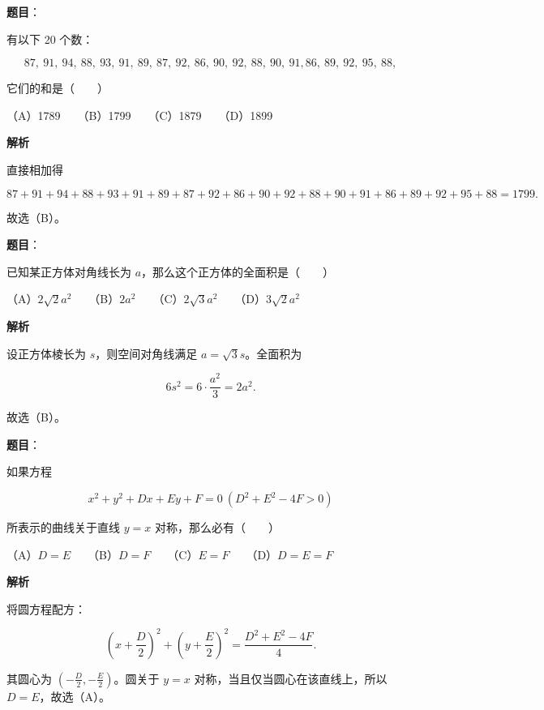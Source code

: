\begin{answer}

\textbf{题目}：

有以下 20 个数：

\nopagebreak[4]
\[
87,\ 91,\ 94,\ 88,\ 93,\ 91,\ 89,\ 87,\ 92,\ 86,\ 90,\ 92,\ 88,\ 90,\ 91,
86,\ 89,\ 92,\ 95,\ 88,
\]

它们的和是\mbox{（　　）}

（A）1789　　（B）1799　　（C）1879　　（D）1899

\textbf{解析}

直接相加得

\nopagebreak[4]
\[
87+91+94+88+93+91+89+87+92+86
+90+92+88+90+91+86+89+92+95+88=1799.
\]

故选（B）。


\end{answer}
\begin{answer}

\textbf{题目}：

已知某正方体对角线长为 $a$，那么这个正方体的全面积是\mbox{（　　）}

（A）$2\sqrt2a^2$　　（B）$2a^2$　　（C）$2\sqrt3a^2$　　（D）$3\sqrt2a^2$

\textbf{解析}

设正方体棱长为 $s$，则空间对角线满足 $a=\sqrt3s$。全面积为

\nopagebreak[4]
\[
6s^2=6\cdot\frac{a^2}{3}=2a^2.
\]

故选（B）。


\end{answer}
\begin{answer}

\textbf{题目}：

如果方程

\nopagebreak[4]
\[
x^2+y^2+Dx+Ey+F=0\ (D^2+E^2-4F>0)
\]

所表示的曲线关于直线 $y=x$ 对称，那么必有\mbox{（　　）}

（A）$D=E$　　（B）$D=F$　　（C）$E=F$　　（D）$D=E=F$

\textbf{解析}

将圆方程配方：

\nopagebreak[4]
\[
\left(x+\frac D2\right)^2+\left(y+\frac E2\right)^2
=\frac{D^2+E^2-4F}{4}.
\]

其圆心为 $\left(-\frac D2,-\frac E2\right)$。圆关于 $y=x$ 对称，当且仅当圆心在该直线上，所以 $D=E$，故选（A）。


\end{answer}
